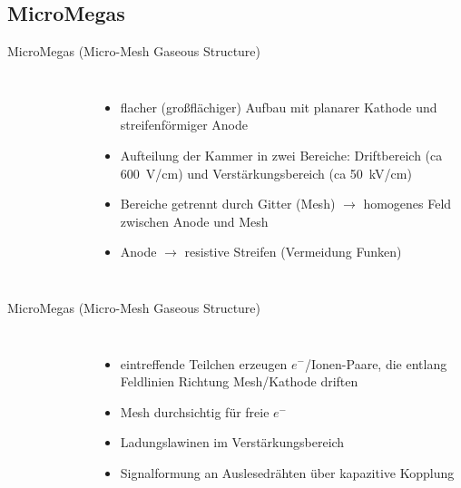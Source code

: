 \subsection[]{MicroMegas}

\begin{frame}{MicroMegas (Micro-Mesh Gaseous Structure)}
    \begin{columns}[T]
			\begin{figure}[htbp]
			  \centering
			  
			\end{figure}
			
	    	\begin{itemize}
	    	  \item flacher (großflächiger) Aufbau mit planarer Kathode und streifenförmiger Anode
	    	  \item Aufteilung der Kammer in zwei Bereiche: Driftbereich (ca 600~V/cm) und
	    	  Verstärkungsbereich (ca 50~kV/cm)
	    	  \item Bereiche getrennt durch Gitter (Mesh) $\rightarrow$ homogenes Feld zwischen Anode
	    	  und Mesh
	    	  \item Anode $\rightarrow$ resistive Streifen (Vermeidung Funken)
			\end{itemize}
    \end{columns}
\end{frame}


\begin{frame}{MicroMegas (Micro-Mesh Gaseous Structure)}
    \begin{columns}[T]
			\begin{figure}[htbp]
			  \centering
			  
			\end{figure}
	    	\begin{itemize}
	    	  \item eintreffende Teilchen erzeugen $e^-$/Ionen-Paare, die entlang Feldlinien Richtung
	    	  Mesh/Kathode driften
	    	  \item Mesh durchsichtig für freie $e^-$
	    	  \item Ladungslawinen im Verstärkungsbereich
	    	  \item Signalformung an Auslesedrähten über kapazitive Kopplung
			\end{itemize}
    \end{columns} 
\end{frame}

